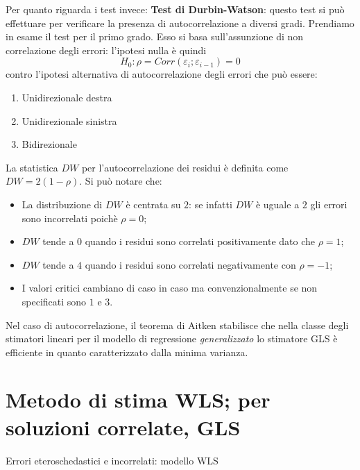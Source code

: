 \documentclass[a4page, 11pt]{article} %
\begin{document}
Per quanto riguarda i test invece:
\newline
\textbf{Test di Durbin-Watson}: questo test si può effettuare per verificare la presenza di autocorrelazione a diversi gradi. 
Prendiamo in esame il test per il primo grado. Esso si basa sull’assunzione di non correlazione degli errori: l’ipotesi nulla è quindi \begin{equation*}
H_0:  \rho = Corr( \varepsilon_i  ;\varepsilon_{i-1} )=0
\end{equation*}
contro l’ipotesi alternativa di autocorrelazione degli errori che può essere:
\begin{enumerate}[noitemsep]
\item Unidirezionale destra
\item Unidirezionale sinistra
\item Bidirezionale	
\end{enumerate}

La statistica $DW$ per l'autocorrelazione dei residui è definita come $DW=2(1-\rho)$. Si può notare che: 
\begin{itemize}[noitemsep]
\item La distribuzione di $DW$ è centrata su $2$: se infatti $DW$ è uguale a $2$ gli errori sono incorrelati poichè $\rho = 0$; 
\item $DW$ tende a $0$ quando i residui sono correlati positivamente dato che $\rho = 1$;
\item $DW$ tende a $4$ quando i residui sono correlati negativamente con $\rho = -1$; 
\item I valori critici cambiano di caso in caso ma convenzionalmente se non specificati sono $1$ e $3$. 

\end{itemize}
Nel caso di autocorrelazione, il teorema di Aitken stabilisce che nella classe degli stimatori lineari per il modello di regressione \textit{generalizzato} lo stimatore GLS è efficiente in quanto caratterizzato dalla minima varianza. 


\section{Metodo di stima WLS; per soluzioni correlate, GLS }

\begin{itshape}
Errori eteroschedastici e incorrelati: modello WLS
\end{itshape}%
\end{document}
